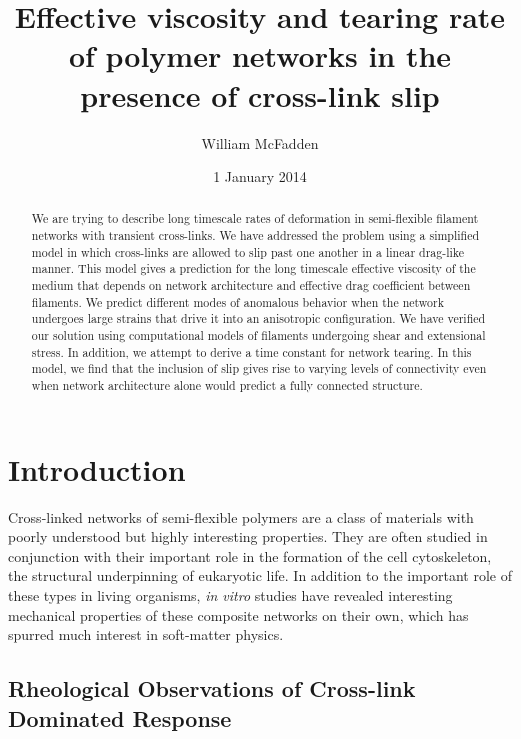\documentclass[pre,preprint]{revtex4-1}
\begin{document}
\title{Effective viscosity and tearing rate of polymer networks in the presence of cross-link slip}
\author{William McFadden}

\date{1 January 2014}

\begin{abstract}
We are trying to describe long timescale rates of deformation in semi-flexible filament networks with transient cross-links.  We have addressed the problem using a simplified model in which cross-links are allowed to slip past one another in a linear drag-like manner.  This model gives a prediction for the long timescale effective viscosity of the medium that depends on network architecture and effective drag coefficient between filaments.  We predict different modes of anomalous behavior when the network undergoes large strains that drive it into an anisotropic configuration.  We have verified our solution using computational models of filaments undergoing shear and extensional stress.  In addition, we attempt to derive a time constant for network tearing.  In this model, we find that the inclusion of slip gives rise to varying levels of connectivity even when network architecture alone would predict a fully connected structure.
\end{abstract}

\maketitle


\tableofcontents

\section{Introduction}

Cross-linked networks of semi-flexible polymers are a class of materials with poorly understood but highly interesting properties.  They are often studied in conjunction with their important role in the formation of the cell cytoskeleton, the structural underpinning of eukaryotic life.   In addition to the important role of these types in living organisms\cite{cellmech_review1,cellmech_review2}, {\em in vitro} studies have revealed interesting mechanical properties of these composite networks on their own, which has spurred much interest in soft-matter physics\cite{megareview}.  

\subsection{Rheological Observations of Cross-link Dominated Response}
\end{document}

